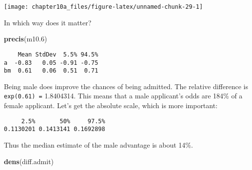 \documentclass[]{tufte-handout}
\newenvironment{Shaded}{}{}
\newcommand{\KeywordTok}[1]{\textcolor[rgb]{0.00,0.44,0.13}{\textbf{#1}}}
\newcommand{\FloatTok}[1]{\textcolor[rgb]{0.25,0.63,0.44}{#1}}
\newcommand{\StringTok}[1]{\textcolor[rgb]{0.25,0.44,0.63}{#1}}
\newcommand{\OperatorTok}[1]{\textcolor[rgb]{0.40,0.40,0.40}{#1}}
\newcommand{\NormalTok}[1]{#1}
\begin{document}
\texttt{[image: chapter10a\_files/figure-latex/unnamed-chunk-29-1]}

In which way does it matter?

\begin{Shaded}
\begin{Highlighting}[]
\KeywordTok{precis}\NormalTok{(m10}\FloatTok{.6}\NormalTok{)}
\end{Highlighting}
\end{Shaded}

\begin{verbatim}
    Mean StdDev  5.5% 94.5%
a  -0.83   0.05 -0.91 -0.75
bm  0.61   0.06  0.51  0.71
\end{verbatim}

Being male does improve the chances of being admitted. The relative
difference is \texttt{exp(0.61)\ =} 1.8404314. This means that a male
applicant's odds are 184\% of a female applicant. Let's get the absolute
scale, which is more important:

\begin{Shaded}
\end{Shaded}

\begin{verbatim}
     2.5%       50%     97.5% 
0.1130201 0.1413141 0.1692898 
\end{verbatim}

Thus the median estimate of the male advantage is about 14\%.

\begin{Shaded}
\begin{Highlighting}[]
\KeywordTok{dens}\NormalTok{(diff.admit)}
\end{Highlighting}
\end{Shaded}
\end{document}
